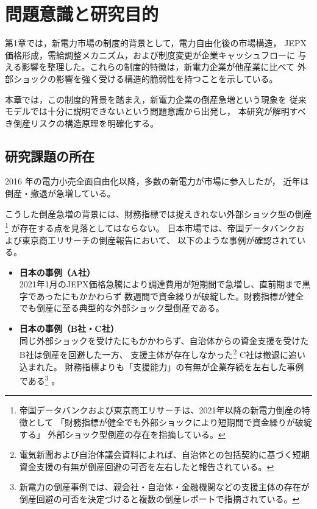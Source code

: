 

\chapter[問題意識と研究目的]{問題意識と研究目的}
\label{chap:research_question}

第1章では，新電力市場の制度的背景として，電力自由化後の市場構造，
JEPX 価格形成，需給調整メカニズム，および制度変更が企業キャッシュフローに
与える影響を整理した。これらの制度的特徴は，新電力企業が他産業に比べて
外部ショックの影響を強く受ける構造的脆弱性を持つことを示している。

本章では，この制度的背景を踏まえ，新電力企業の倒産急増という現象を
従来モデルでは十分に説明できないという問題意識から出発し，
本研究が解明すべき倒産リスクの構造原理を明確化する。


\section{研究課題の所在}

2016 年の電力小売全面自由化以降，多数の新電力が市場に参入したが，
近年は倒産・撤退が急増している。

こうした倒産急増の背景には、財務指標では捉えきれない外部ショック型の倒産\footnote{
帝国データバンクおよび東京商工リサーチは、2021年以降の新電力倒産の特徴として
「財務指標が健全でも外部ショックにより短期間で資金繰りが破綻する」
外部ショック型倒産の存在を指摘している。
}
が存在する点を見落としてはならない。
日本市場では、帝国データバンクおよび東京商工リサーチの倒産報告\parencite{TDB2021PowerCrisis,TSR2021PowerCrisis}において、
以下のような事例が確認されている。


\begin{itemize}
    \item \textbf{日本の事例（A社）}\\  
    2021年1月のJEPX価格急騰により調達費用が短期間で急増し、直前期まで黒字であったにもかかわらず
    数週間で資金繰りが破綻した。財務指標が健全でも倒産に至る典型的な外部ショック型倒産である。

    \item \textbf{日本の事例（B社・C社）}\\  
    同じ外部ショックを受けたにもかかわらず、自治体からの資金支援を受けたB社は倒産を回避した一方、
    支援主体が存在しなかった\footnote{電気新聞および自治体議会資料によれば、自治体との包括契約に基づく短期資金支援の有無が倒産回避の可否を左右したと報告されている。}
C社は撤退に追い込まれた\parencite{DenkiShimbun2021Crisis,CityCouncil2021Support}。
    財務指標よりも「支援能力」の有無が企業存続を左右した事例である\footnote{新電力の倒産事例では、親会社・自治体・金融機関などの支援主体の存在が倒産回避の可否を決定づけると複数の倒産レポートで指摘されている。}
。
\end{itemize}


